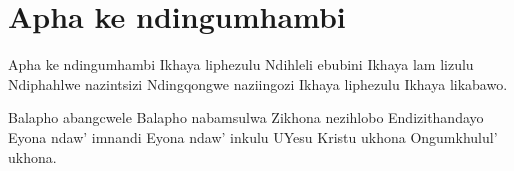 \starttocol
\chapter{Apha ke ndingumhambi}
\nexttocol
\hfill{\it }
\stoptocol
\starttocol
\startlines
{\sc Apha} ke ndingumhambi
Ikhaya liphezulu
Ndihleli ebubini
Ikhaya lam lizulu
Ndiphahlwe nazintsizi
Ndingqongwe naziingozi
Ikhaya liphezulu
Ikhaya likabawo.
 
Balapho abangcwele
Balapho nabamsulwa
Zikhona nezihlobo
Endizithandayo
Eyona ndaw' imnandi
Eyona ndaw' inkulu
UYesu Kristu ukhona
Ongumkhulul' ukhona.


\stoplines
\nexttocol

\stoptocol
